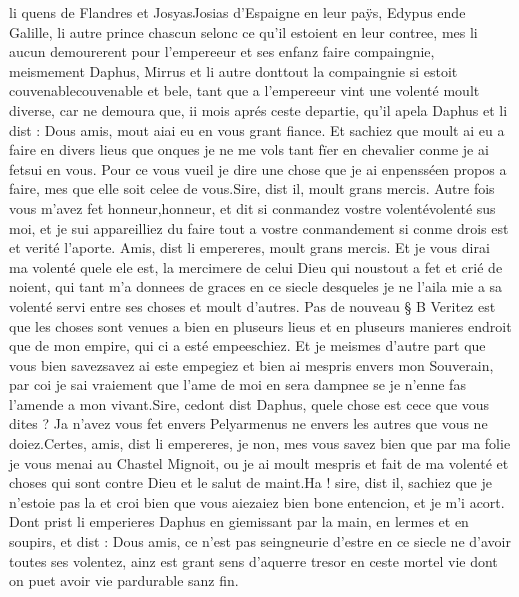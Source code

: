 \documentclass{article}
\begin{document}
\begin{pages}
   li quens de Flandres et 
   JosyasJosias d'Espaigne en leur paÿs, 
   Edypus ende 
   Galille, li autre prince chascun selonc ce qu’il estoient en leur contree, mes li aucun demourerent 
   pour l’empereeur et ses enfanz faire compaingnie, 
   meismement Daphus, 
   Mirrus et li autre donttout 
   la compaingnie si estoit couvenablecouvenable et bele, 
   tant que a l’empereeur vint une volenté moult diverse, car ne demoura que, 
   ii mois aprés ceste departie, qu’il apela Daphus et li dist :
   Dous amis, mout aiai eu en vous grant fiance. 
   Et sachiez que moult ai eu a faire en divers lieus que onques 
   je ne me vols tant fïer en chevalier conme je ai fetsui en vous. 
   Pour ce vous vueil je dire une chose que je ai enpensséen propos a faire, 
   mes que elle soit celee de vous.Sire, dist il, moult grans mercis. Autre fois vous m’avez fet 
      honneur,honneur, et dit 
      si conmandez vostre volentévolenté sus moi, 
      et je sui appareilliez du 
      faire tout a vostre conmandement si conme drois est 
      et verité l’aporte.
   Amis, dist li empereres, moult grans mercis. 
      Et je vous dirai ma volenté quele ele est, la mercimere 
      de celui Dieu qui noustout
      a fet et crié de noient, 
      qui tant m’a donnees de graces en ce siecle desqueles je ne l’aila 
      mie a sa volenté servi entre ses choses et moult d’autres. \pend
\pstart Pas de nouveau § B
   Veritez est que les choses sont venues a bien 
   en pluseurs lieus et
   en pluseurs manieres endroit que de mon empire, qui ci a esté empeeschiez. 
   Et je meismes d’autre part que vous bien savezsavez ai este empegiez 
      et bien ai mespris envers mon Souverain, 
   par coi je sai vraiement que l’ame de moi en sera dampnee 
      se je n’enne fas l’amende a mon vivant.Sire, cedont dist 
      Daphus, quele chose est cece que vous dites ? 
      Ja n’avez vous fet envers Pelyarmenus ne envers les autres que vous ne doiez.Certes, amis, dist li empereres, je non, 
   mes vous savez bien que par ma folie je vous menai au Chastel Mignoit, 
   ou je ai moult mespris et fait de ma volenté et choses qui sont contre Dieu et le salut de maint.Ha ! sire, dist il, sachiez que je n’estoie pas la et croi bien que vous 
      aiezaiez bien bone entencion, et je m’i acort. 
   Dont prist li emperieres 
   Daphus en giemissant 
   par la main, en lermes et en soupirs, et dist :
   Dous amis, ce n'est pas seingneurie d’estre 
      en ce siecle ne d’avoir toutes ses volentez, 
      ainz est grant sens d’aquerre tresor en ceste mortel vie dont on puet avoir vie 
      pardurable sanz fin.

\end{pages}
\end{document}
